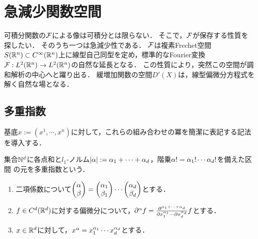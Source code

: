 \documentclass[uplatex,dvipdfmx]{jsreport}
\begin{document}
\section{急減少関数空間}

\begin{tcolorbox}[colframe=ForestGreen, colback=ForestGreen!10!white,breakable,colbacktitle=ForestGreen!40!white,coltitle=black,fonttitle=\bfseries\sffamily,
title=]
    可積分関数の$\mathcal{F}$による像は可積分とは限らない．
    そこで，$\mathcal{F}$が保存する性質を探したい．
    そのうち一つは急減少性である．
    $\mathcal{F}$は複素Frechet空間$S(\mathbb{R}^n)\subset C^\infty(\mathbb{R}^n)$上に線型自己同型を定め，標準的なFourier変換$\mathcal{F}:L^2(\mathbb{R}^n)\to L^2(\mathbb{R}^n)$の自然な延長となる．
    この性質により，突然この空間が調和解析の中心へと躍り出る．
    緩増加関数の空間$D'(X)$は，線型偏微分方程式を解く自然な場となる．
\end{tcolorbox}

\subsection{多重指数}

\begin{tcolorbox}[colframe=ForestGreen, colback=ForestGreen!10!white,breakable,colbacktitle=ForestGreen!40!white,coltitle=black,fonttitle=\bfseries\sffamily,
title=]
    基底$x:=(x^1,\cdots,x^n)$に対して，これらの組み合わせの冪を簡潔に表記する記法を導入する．
\end{tcolorbox}

\begin{definition}
    集合$\mathbb{N}^d$に各点和と$l_1$-ノルム$\lvert\alpha\rvert:=\alpha_1+\cdots+\alpha_d$，階乗$\alpha!=\alpha_1!\cdots\alpha_d!$を備えた区間
    の元を多重指数という．
    \begin{enumerate}
        \item 二項係数について$\begin{pmatrix}\alpha\\\beta\end{pmatrix}=\begin{pmatrix}\alpha_1\\\beta_1\end{pmatrix}\cdots\begin{pmatrix}\alpha_d\\\beta_d\end{pmatrix}$とする．
        \item $f\in C^d(\mathbb{R}^d)$に対する偏微分について，$\partial^\alpha f=\frac{\partial^{\alpha_1+\cdots+\alpha_d}}{\partial x_1^{\alpha_1}\cdots\partial x_d^{\alpha_d}}f$とする．
        \item $x\in\mathbb{R}^d$に対して，$x^\alpha=x_1^{\alpha_1}\cdots x_d^{\alpha_d}$とする．
    \end{enumerate}
\end{definition}
\end{document}
